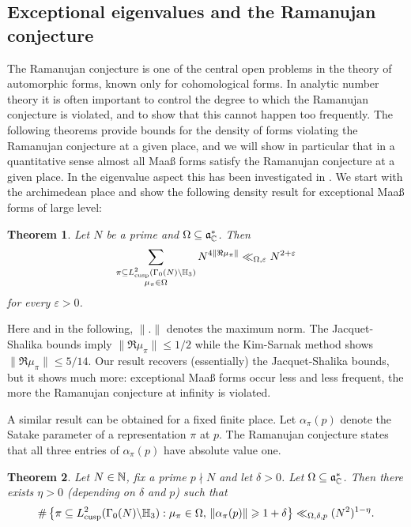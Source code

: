 \documentclass[11pt]{amsart}
\theoremstyle{plain}
\newtheorem{theorem}{Theorem}
\numberwithin{equation}{section}
\theoremstyle{definition}
\renewcommand{\geq}{\geqslant}
\renewcommand{\leq}{\leqslant}
\begin{document}
\subsection{Exceptional eigenvalues and the Ramanujan conjecture} The Ramanujan conjecture is one of the central open problems in the theory of automorphic forms, known only for cohomological forms. In analytic number theory it is often important to control the degree to which the Ramanujan conjecture is violated, and to show that this cannot happen too frequently. The following theorems provide  bounds for the density of forms violating the Ramanujan conjecture at a given place, and we will show in particular that in a quantitative sense almost all Maa{\ss} forms satisfy the Ramanujan conjecture at a given place.  In the eigenvalue aspect this has been investigated in \cite{BBR}. We start with the archimedean place and show the following density result for exceptional Maa{\ss} forms of large level:
\begin{theorem}\label{thm4} Let $N$ be a prime and $\Omega \subseteq \mathfrak{a}_{\Bbb{C}}^{\ast}$.  Then
  $$ \sum_{\substack{\pi \subseteq L_{\text{{\rm cusp}}}^2(\Gamma_0(N) \backslash \Bbb{H}_3) \\ \mu_{\pi} \in \Omega}} N^{4\|\Re  \mu_{\pi}\|} \ll_{\Omega, \varepsilon} N^{2+\varepsilon}$$
  for every $\varepsilon > 0$. 
   \end{theorem}
   Here and in the following, $\| . \|$ denotes the maximum norm. 
The Jacquet-Shalika \cite{JS} bounds imply $\|\Re  \mu_{\pi}\| \leq 1/2$ while the Kim-Sarnak method shows $\|\Re  \mu_{\pi}\| \leq 5/14$. Our result recovers (essentially) the Jacquet-Shalika bounds, but it shows much more: exceptional Maa{\ss} forms occur   less and less frequent, the more the Ramanujan conjecture at infinity is violated. 

A similar result can be obtained for a fixed finite place. Let $\alpha_{\pi}(p )$ %
denote the Satake parameter of a representation  $\pi$ at $p$. The Ramanujan conjecture states that  all three entries of $\alpha_{\pi}( p)$ have absolute value one. 
\begin{theorem}\label{thm5} Let $N \in \Bbb{N}$,  fix a prime $p \nmid N$ and let $\delta > 0$. Let $\Omega \subseteq \mathfrak{a}_{\Bbb{C}}^{\ast}$.  Then there exists $\eta > 0$ (depending on $\delta$ and $p$) such that  
$$\#\left\{ \pi \subseteq L_{\text{{\rm cusp}}}^2(\Gamma_0(N) \backslash \Bbb{H}_3) :  \mu_{\pi} \in \Omega, \, \| \alpha_{\pi}( p)\| %
 \geq 1 + \delta\right\} \ll_{\Omega, \delta, p} (N^2)^{1 - \eta}.$$
\end{theorem}    
\end{document}
